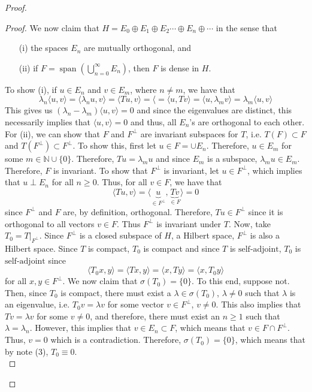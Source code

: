 \documentclass[oneside]{book}
\newcommand{\N}{{\mathbb N}}
\newcommand{\la}{\langle}
\newcommand{\ra}{\rangle}
\DeclareMathOperator{\Span}{span}
\newcommand{\sbs}{\subset}
\newcommand{\saj}{\text{self-adjoint}}
\begin{document}
\begin{proof}
\begin{proof}
We now claim that $H = E_0 \oplus E_1 \oplus E_2 \cdots \oplus E_n \oplus \cdots$ in the sense that 
\begin{enumerate}
\item[(i)] the spaces $E_n$ are mutually orthogonal, and
\item[(ii)] if $F = \Span\left( \bigcup\limits_{n = 0}^{\infty} E_n \right)$, then $F$ is dense in $H$. 
\end{enumerate}
To show (i), if $u \in E_n$ and $v \in E_m$, where $n \neq m$, we have that 
\[ \lambda_n \la u, v \ra = \la \lambda_n u, v \ra = \la Tu, v \ra = \la  = \la u, Tv \ra = \la u, \lambda_m v \ra = \lambda_m \la u, v \ra\]
This gives us $(\lambda_n - \lambda_m) \la u, v \ra = 0$ and since the eigenvalues are distinct, this necessarily implies that $\la u, v \ra = 0$ and thus, all $E_n$'s are orthogonal to each other. \\
\indent For (ii), we can show that $F$ and $F^{\perp}$ are invariant subspaces for $T$, i.e. $T(F) \sbs F$ and $T(F^{\perp}) \sbs F^{\perp}$. To show this, first let $u\in F = \cup E_n$. Therefore, $u \in E_m$ for some $m \in \N \cup \{ 0\}$. Therefore, $Tu = \lambda_m u$ and since $E_m$ is a subspace, $\lambda_m u \in E_m$. Therefore, $F$ is invariant. To show that $F^{\perp}$ is invariant, let $u \in F^{\perp}$, which implies that $u \perp E_n$ for all $n \geq 0$. Thus, for all $v \in F$, we have that 
\[ \la Tu, v \ra = \la \underbrace{u}_{\in F^{\perp}}, \underbrace{Tv}_{\in F} \ra = 0\]
since $F^{\perp}$ and $F$ are, by definition, orthogonal. Therefore, $Tu \in F^{\perp}$ since it is orthogonal to all vectors $v \in F$. Thus $F^{\perp}$ is invariant under $T$. Now, take $T_0 = T \vert_{F^{\perp}}$. Since $F^{\perp}$ is a closed subspace of $H$, a Hilbert space, $F^{\perp}$ is also a Hilbert space. Since $T$ is compact, $T_0$ is compact and since $T$ is $\saj$, $T_0$ is $\saj$ since 
\[ \la T_0 x, y \ra = \la Tx , y \ra = \la x, Ty \ra = \la x, T_0 y \ra\]
for all $x, y \in F^{\perp}$. We now claim that $\sigma(T_0) = \{ 0 \}$. To this end, suppose not. Then, since $T_0$ is compact, there must exist a $\lambda \in \sigma(T_0)$, $\lambda \neq 0$ such that $\lambda$ is an eigenvalue, i.e. $T_0 v = \lambda v$ for some vector $v \in F^{\perp}$, $v \neq 0$. This also implies that $Tv = \lambda v$ for some $v \neq 0$, and therefore, there must exist an $n \geq 1$ such that $\lambda = \lambda_n$. However, this implies that $v \in E_n \sbs F$, which means that $v \in F \cap F^{\perp}$. Thus, $v = 0$ which is a contradiction. Therefore, $\sigma(T_0) = \{ 0 \}$, which  means that by note (3), $T_0 \equiv 0$. \\

\end{proof}
\end{proof}
\end{document}
